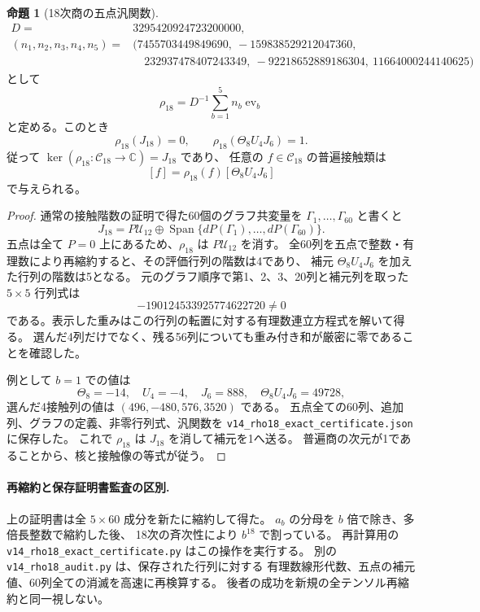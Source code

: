 \documentclass[a4paper,11pt]{ltjsarticle}
\theoremstyle{definition}
\newtheorem{proposition}[theorem]{命題}
\begin{document}
\begin{proposition}[18次商の五点汎関数]
\label{prop:v14-rho-eighteenth}
\begin{align*}
 D={}&3295420924723200000,\\
 (n_1,n_2,n_3,n_4,n_5)={}&
 (7455703449849690,\ -159838529212047360,\\
 &\hspace{1em}232937478407243349,\ -92218652889186304,\
 11664000244140625)
\end{align*}
として
\[
 \rho_{18}=D^{-1}\sum_{b=1}^{5}n_b\operatorname{ev}_b
\]
と定める。このとき
\[
 \rho_{18}(J_{18})=0,\qquad
 \rho_{18}(\Theta_8U_4J_6)=1.
\]
従って $\ker(\rho_{18}:\mathcal C_{18}\to\mathbb C)=J_{18}$ であり、
任意の $f\in\mathcal C_{18}$ の普遍接触類は
\[
 [f]=\rho_{18}(f)[\Theta_8U_4J_6]
\]
で与えられる。
\end{proposition}

\begin{proof}
通常の接触階数の証明で得た60個のグラフ共変量を
$\Gamma_1,\ldots,\Gamma_{60}$ と書くと
\[
 J_{18}=P\mathcal U_{12}\oplus
        \operatorname{Span}\{dP(\Gamma_1),\ldots,dP(\Gamma_{60})\}.
\]
五点は全て $P=0$ 上にあるため、$\rho_{18}$ は $P\mathcal U_{12}$ を消す。
全60列を五点で整数・有理数により再縮約すると、その評価行列の階数は4であり、
補元 $\Theta_8U_4J_6$ を加えた行列の階数は5となる。
元のグラフ順序で第1、2、3、20列と補元列を取った $5\times5$ 行列式は
\[
 -190124533925774622720\ne0
\]
である。表示した重みはこの行列の転置に対する有理数連立方程式を解いて得る。
選んだ4列だけでなく、残る56列についても重み付き和が厳密に零であることを確認した。

例として $b=1$ での値は
\[
 \Theta_8=-14,\quad U_4=-4,\quad J_6=888,\quad
 \Theta_8U_4J_6=49728,
\]
選んだ4接触列の値は $(496,-480,576,3520)$ である。
五点全ての60列、追加列、グラフの定義、非零行列式、汎関数を
\texttt{v14\_rho18\_exact\_certificate.json} に保存した。
これで $\rho_{18}$ は $J_{18}$ を消して補元を1へ送る。
普遍商の次元が1であることから、核と接触像の等式が従う。
\end{proof}

\paragraph{再縮約と保存証明書監査の区別.}
上の証明書は全 $5\times60$ 成分を新たに縮約して得た。
$a_b$ の分母を $b$ 倍で除き、多倍長整数で縮約した後、
18次の斉次性により $b^{18}$ で割っている。
再計算用の \texttt{v14\_rho18\_exact\_certificate.py} はこの操作を実行する。
別の \texttt{v14\_rho18\_audit.py} は、保存された行列に対する
有理数線形代数、五点の補元値、60列全ての消滅を高速に再検算する。
後者の成功を新規の全テンソル再縮約と同一視しない。
\end{document}
